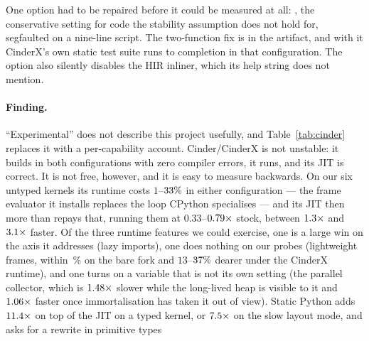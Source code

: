 One option had to be repaired before it could be measured at all: , the conservative setting for code the stability assumption does not
hold for, segfaulted on a nine-line script. The two-function fix is in the artifact, and with it
CinderX's own static test suite runs to completion in that configuration. The option also
silently disables the HIR inliner, which its help string does not mention.

\paragraph{Finding.} ``Experimental'' does not describe this project usefully, and
Table~\ref{tab:cinder} replaces it with a per-capability account. Cinder/CinderX is not
unstable: it builds in both configurations with zero compiler errors, it runs, and its
JIT is correct. It is not free, however, and it is easy to measure backwards. On our six untyped kernels
its runtime costs $1$--$\meas{pct:b6_cinderx-fork_cinderx:mandelbrot/fork_cinderx|b6_cinderx-stock:mandelbrot/stock}{33}\%$ in either configuration --- the frame evaluator it installs
replaces the loop CPython specialises --- and its JIT then more than repays that, running them
at $0.33$--$\meas{ratio:b6_cinderx-fork_jit:binarytrees/fork_jit|b6_cinderx-stock:binarytrees/stock}{0.79}\times$ stock, between $\meas{ratio:b6_cinderx-stock:binarytrees/stock|b6_cinderx-fork_jit:binarytrees/fork_jit}{1.3}\times$ and $\meas{ratio:b6_cinderx-stock:mandelbrot/stock|b6_cinderx-fork_jit:mandelbrot/fork_jit}{3.1}\times$ faster. Of the three runtime features we could
exercise, one is a large win on the axis it addresses (lazy imports), one does nothing on our
probes (lightweight frames, within \,\% on the bare fork and $13$--$\meas{pct:b6_cinderx-fork_cinderx:call_depth_200/fork_cinderx|b6_cinderx-stock:call_depth_200/stock}{37}\%$ dearer under the
CinderX runtime), and one turns on a variable that is not its own setting (the parallel
collector, which is $\meas{ratio:b6_gcscale-fork_cinderx:gc_collect/fork_cinderx/state_visible_par6|b6_gcscale-fork_cinderx:gc_collect/fork_cinderx/state_visible_serial}{1.48}\times$ slower while the long-lived heap is visible to it and
$\meas{ratio:b6_gcscale-fork_cinderx:gc_collect/fork_cinderx/immortal_serial|b6_gcscale-fork_cinderx:gc_collect/fork_cinderx/immortal_par6}{1.06}\times$ faster once immortalisation has taken it out of view). Static Python
adds $\meas{ratio:b6_static-fork_static:matmul96_int/fork_static/boxed_jit|b6_static-fork_static_adaptive:matmul96_int/fork_static_adaptive/static_jit}{11.4}\times$ on top of the JIT on a typed kernel, or $\meas{ratio:b6_static-fork_static:matmul96_int/fork_static/boxed_jit|b6_static-fork_static:matmul96_int/fork_static/static_jit}{7.5}\times$ on the slow layout mode, and asks for a rewrite in primitive types

